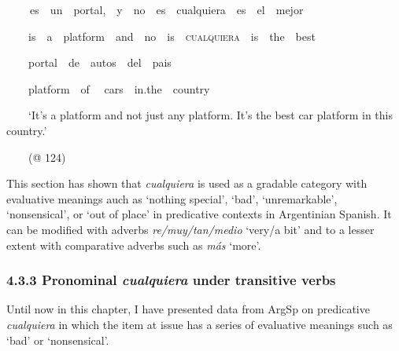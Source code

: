 \begin{styleStandard}
\label{bkm:Ref63460922}\textbf{\ \ }\ \ es\ \ un\ \ portal,\ \ y\ \ no\ \ es\ \ cualquiera\ \ es\ \ el\ \ mejor\ \ 
\end{styleStandard}

\begin{styleStandard}
\ \ \ \ is\ \ a\ \ platform\ \ and\ \ no\ \ is\ \ \textsc{cualquiera}\ \ is\ \ the\ \ best
\end{styleStandard}

\begin{styleStandard}
\ \ \ \ portal\ \ de\ \ autos\ \ del\ \ pais
\end{styleStandard}

\begin{styleStandard}
\ \ \ \ platform\ \ of \ \ cars\ \ in.the\ \ country
\end{styleStandard}

\begin{styleStandard}
\ \ \ \ ‘It’s a platform and not just any platform. It’s the best car platform in this country.’
\end{styleStandard}

\begin{styleStandard}
\ \ \ \ (@ 124)
\end{styleStandard}

\begin{styleStandard}
This section has shown that \textit{cualquiera} is used as a gradable category with evaluative meanings auch as ‘nothing special’, ‘bad’, ‘unremarkable’, ‘nonsensical’, or ‘out of place’ in predicative contexts in Argentinian Spanish. It can be modified with adverbs \textit{re/muy/tan/medio} ‘very/a bit’ and to a lesser extent with comparative adverbs such as \textit{más} ‘more’.
\end{styleStandard}

\subsubsection[4.3.3 Pronominal cualquiera under transitive verbs]{\textbf{4.3.3 Pronominal }\textbf{\textit{cualquiera}}\textbf{\textit{ }}\textbf{under transitive verbs}}
\begin{styleStandard}
Until now in this chapter, I have presented data from ArgSp on predicative \textit{cualquiera} in which the item at issue has a series of evaluative meanings such as ‘bad’ or ‘nonsensical’. 
\end{styleStandard}

